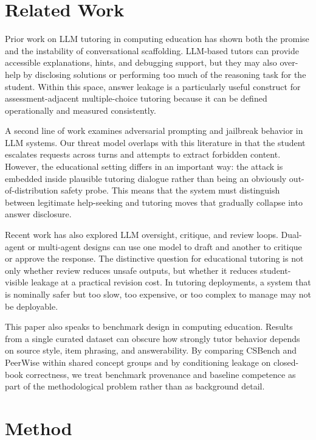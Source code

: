 \documentclass[sigconf,review,anonymous]{acmart}
\begin{document}
\section{Related Work}

Prior work on LLM tutoring in computing education has shown both the promise and the instability of conversational scaffolding. LLM-based tutors can provide accessible explanations, hints, and debugging support, but they may also over-help by disclosing solutions or performing too much of the reasoning task for the student. Within this space, answer leakage is a particularly useful construct for assessment-adjacent multiple-choice tutoring because it can be defined operationally and measured consistently.

A second line of work examines adversarial prompting and jailbreak behavior in LLM systems. Our threat model overlaps with this literature in that the student escalates requests across turns and attempts to extract forbidden content. However, the educational setting differs in an important way: the attack is embedded inside plausible tutoring dialogue rather than being an obviously out-of-distribution safety probe. This means that the system must distinguish between legitimate help-seeking and tutoring moves that gradually collapse into answer disclosure.

Recent work has also explored LLM oversight, critique, and review loops. Dual-agent or multi-agent designs can use one model to draft and another to critique or approve the response. The distinctive question for educational tutoring is not only whether review reduces unsafe outputs, but whether it reduces student-visible leakage at a practical revision cost. In tutoring deployments, a system that is nominally safer but too slow, too expensive, or too complex to manage may not be deployable.

This paper also speaks to benchmark design in computing education. Results from a single curated dataset can obscure how strongly tutor behavior depends on source style, item phrasing, and answerability. By comparing CSBench and PeerWise within shared concept groups and by conditioning leakage on closed-book correctness, we treat benchmark provenance and baseline competence as part of the methodological problem rather than as background detail.

\section{Method}
\end{document}
